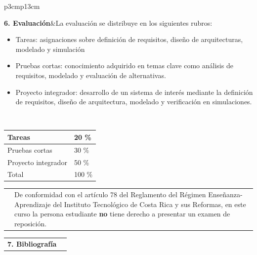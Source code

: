 \documentclass[letterpaper]{article}%
\begin{document}
\begin{tabularx}{\textwidth}{p{3cm}p{13cm}}%
\par\fontsize{12}{14}\selectfont \textbf{\textcolor{parte}{6. Evaluación}}&La evaluación se distribuye en los siguientes rubros: \newline \begin{itemize} \item Tareas: asignaciones sobre definición de requisitos, diseño de arquitecturas, modelado y simulación \item Pruebas cortas: conocimiento adquirido en temas clave como análisis de requisitos, modelado y evaluación de alternativas. \item Proyecto integrador: desarrollo de un sistema de interés mediante la definición de requisitos, diseño de arquitectura, modelado y verificación en simulaciones. \end{itemize}\\%
\end{tabularx}%
\vspace*{2mm}%
\newline%
 \begin{minipage}{\linewidth}  \centering  \begin{tabular}{ p{4cm}  p{1.5cm} }  \toprule  Tareas & 20 \% \\  \midrule  Pruebas cortas & 30 \% \\  \midrule  Proyecto integrador & 50 \% \\  \midrule Total & 100 \% \\  \bottomrule  \end{tabular} \end{minipage}%
\vspace*{2mm}%
\newline%
\begin{tabularx}{\textwidth}{p{3cm}p{13cm}}%
&De conformidad con el artículo 78 del Reglamento del Régimen Enseñanza-Aprendizaje del Instituto Tecnológico de Costa Rica y sus Reformas, en este curso la persona estudiante \textbf{no} tiene derecho a presentar un examen de reposición.\\%
\end{tabularx}%
\vspace*{4mm}%
\newpage%
\begin{tabularx}{\textwidth}{p{3cm}p{13cm}}%
\par\fontsize{12}{14}\selectfont \textbf{\textcolor{parte}{7. Bibliografía}}&\nocite{incose2023} \nocite{nasa2017} \\%
\end{tabularx}%
\end{document}
